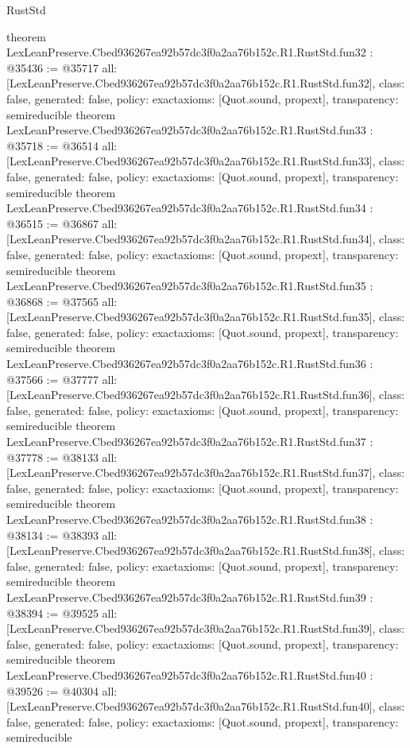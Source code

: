 \begin{lexlean}{RustStd}
\begin{coremodule}
{}
theorem LexLeanPreserve.Cbed936267ea92b57dc3f0a2aa76b152c.R1.RustStd.fun32 : @35436 := @35717 {
  all: [LexLeanPreserve.Cbed936267ea92b57dc3f0a2aa76b152c.R1.RustStd.fun32],
  class: false,
  generated: false,
  policy: exact{axioms: [Quot.sound, propext]},
  transparency: semireducible
}
theorem LexLeanPreserve.Cbed936267ea92b57dc3f0a2aa76b152c.R1.RustStd.fun33 : @35718 := @36514 {
  all: [LexLeanPreserve.Cbed936267ea92b57dc3f0a2aa76b152c.R1.RustStd.fun33],
  class: false,
  generated: false,
  policy: exact{axioms: [Quot.sound, propext]},
  transparency: semireducible
}
theorem LexLeanPreserve.Cbed936267ea92b57dc3f0a2aa76b152c.R1.RustStd.fun34 : @36515 := @36867 {
  all: [LexLeanPreserve.Cbed936267ea92b57dc3f0a2aa76b152c.R1.RustStd.fun34],
  class: false,
  generated: false,
  policy: exact{axioms: [Quot.sound, propext]},
  transparency: semireducible
}
theorem LexLeanPreserve.Cbed936267ea92b57dc3f0a2aa76b152c.R1.RustStd.fun35 : @36868 := @37565 {
  all: [LexLeanPreserve.Cbed936267ea92b57dc3f0a2aa76b152c.R1.RustStd.fun35],
  class: false,
  generated: false,
  policy: exact{axioms: [Quot.sound, propext]},
  transparency: semireducible
}
theorem LexLeanPreserve.Cbed936267ea92b57dc3f0a2aa76b152c.R1.RustStd.fun36 : @37566 := @37777 {
  all: [LexLeanPreserve.Cbed936267ea92b57dc3f0a2aa76b152c.R1.RustStd.fun36],
  class: false,
  generated: false,
  policy: exact{axioms: [Quot.sound, propext]},
  transparency: semireducible
}
theorem LexLeanPreserve.Cbed936267ea92b57dc3f0a2aa76b152c.R1.RustStd.fun37 : @37778 := @38133 {
  all: [LexLeanPreserve.Cbed936267ea92b57dc3f0a2aa76b152c.R1.RustStd.fun37],
  class: false,
  generated: false,
  policy: exact{axioms: [Quot.sound, propext]},
  transparency: semireducible
}
theorem LexLeanPreserve.Cbed936267ea92b57dc3f0a2aa76b152c.R1.RustStd.fun38 : @38134 := @38393 {
  all: [LexLeanPreserve.Cbed936267ea92b57dc3f0a2aa76b152c.R1.RustStd.fun38],
  class: false,
  generated: false,
  policy: exact{axioms: [Quot.sound, propext]},
  transparency: semireducible
}
theorem LexLeanPreserve.Cbed936267ea92b57dc3f0a2aa76b152c.R1.RustStd.fun39 : @38394 := @39525 {
  all: [LexLeanPreserve.Cbed936267ea92b57dc3f0a2aa76b152c.R1.RustStd.fun39],
  class: false,
  generated: false,
  policy: exact{axioms: [Quot.sound, propext]},
  transparency: semireducible
}
theorem LexLeanPreserve.Cbed936267ea92b57dc3f0a2aa76b152c.R1.RustStd.fun40 : @39526 := @40304 {
  all: [LexLeanPreserve.Cbed936267ea92b57dc3f0a2aa76b152c.R1.RustStd.fun40],
  class: false,
  generated: false,
  policy: exact{axioms: [Quot.sound, propext]},
  transparency: semireducible
}
\end{coremodule}
\end{lexlean}
